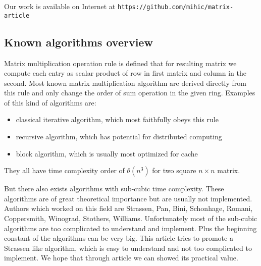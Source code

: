 \documentclass[a4paper,11pt]{article}
\begin{document}

Our work is available on Internet at 
\texttt{https://github.com/mihic/matrix-article}


\subsection{Known algorithms overview}

Matrix multiplication operation rule is defined that for resulting matrix we compute each entry as scalar product of row in first matrix and column in the second. 
Most known matrix multiplication algorithm are derived directly from this rule and only change the order of sum operation in the given ring. 
Examples of this kind of algorithms are:
\begin{itemize}
\item classical iterative algorithm, which most faithfully obeys this rule
\item recursive algorithm, which has potential for distributed computing
\item block algorithm, which is usually most optimized for cache
\end{itemize}

They all have time complexity order of $\theta(n^3)$ for two square $n \times n$ matrix.

But there also exists algorithms with sub-cubic time complexity. These algorithms are of great theoretical importance but are usually not implemented.
Authors which worked on this field are Strassen, Pan, Bini, Schonhage, Romani, Coppersmith, Winograd, Stothers, Williams.
Unfortunately most of the sub-cubic algorithms are too complicated to understand and implement. Plus the beginning constant of the algorithms can be very big. 
This article tries to promote a Strassen like algorithm, which is easy to understand and not too complicated to implement.
We hope that through article we can showed its practical value.
\end{document}
